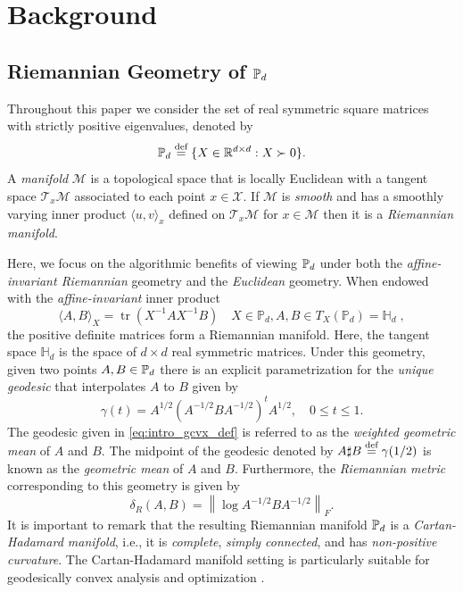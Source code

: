\documentclass[sn-nature]{sn-jnl}%
\theoremstyle{thmstyleone}%
\theoremstyle{thmstyletwo}%
\theoremstyle{thmstylethree}%
\begin{document}
\section{Background}

\subsection{Riemannian Geometry of $\mathbb{P}_d$}\label{sec:background}
Throughout this paper we consider the set of real symmetric square matrices with strictly positive eigenvalues, denoted by 
\[
\mathbb{P}_d \stackrel{\text{def}}{=} \{ X \in \mathbb{R}^{d\times d}: X \succ 0 \}.
\]
 A \textit{manifold} $\mathcal{M}$ is a topological space that is locally Euclidean with a tangent space $\mathcal{T}_x \mathcal{M}$ associated to each point $x \in \mathcal{X}$. If $\mathcal{M}$ is \textit{smooth} and has a smoothly varying inner product $\langle u, v \rangle_x$ defined on $\mathcal{T}_x \mathcal{M}$ for $x \in \mathcal{M}$ then it is a \textit{Riemannian manifold}. 

 Here, we focus on the algorithmic benefits of viewing $\mathbb{P}_d$ under both the \textit{affine-invariant Riemannian} geometry and the \textit{Euclidean} geometry. When endowed with the \textit{affine-invariant} inner product 
 \[\langle A, B\rangle_X=\operatorname{tr}\left(X^{-1} A X^{-1} B\right) \quad X \in \mathbb{P}_d, A, B \in T_X\left(\mathbb{P}_d\right)=\mathbb{H}_d \; ,\]
the positive definite matrices form a Riemannian manifold. 
Here, the tangent space $\mathbb{H}_d$ is the space of $d\times d$ real symmetric matrices. Under this geometry, given two points $A, B \in \mathbb{P}_d$ there is an explicit parametrization for the \textit{unique geodesic} that interpolates $A$ to $B$ given by 
 \begin{equation}\label{eq:intro_gcvx_def}
    \gamma(t)=A^{1 / 2}\left(A^{-1 / 2} B A^{-1 / 2}\right)^t A^{1 / 2}, \quad 0 \leq t \leq 1.
\end{equation}
The geodesic given in \eqref{eq:intro_gcvx_def} is referred to as the \textit{weighted geometric mean} of $A$ and $B$. The midpoint of the geodesic denoted by $A \sharp B \stackrel{\text{def}}{=} \gamma(1/2)$ is known as the \textit{geometric mean} of $A$ and $B$. Furthermore, the \textit{Riemannian metric} corresponding to this geometry is given by 
\begin{equation}\label{eq:riem-metric}
    \delta_R(A, B)=\left\|\log A^{-1 / 2} B A^{-1 / 2}\right\|_F.
\end{equation}
It is important to remark that the resulting Riemannian manifold $\mathbb{P}_d$ is a \textit{Cartan-Hadamard manifold}, i.e., it is \textit{complete}, \textit{simply connected}, and has \textit{non-positive curvature}.  The Cartan-Hadamard manifold setting is particularly suitable for geodesically convex analysis and optimization \cite{Bacak+2014}.
\end{document}
